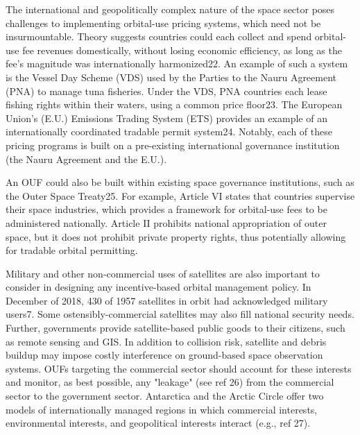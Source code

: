 \documentclass[9pt,twocolumn,twoside,lineno]{pnas-new}
\begin{document}
The international and geopolitically complex nature of the space sector poses challenges to implementing orbital-use pricing systems, which need not be insurmountable. Theory suggests countries could each collect and spend orbital-use fee revenues domestically, without losing economic efficiency, as long as the fee’s magnitude was internationally harmonized22. An example of such a system is the Vessel Day Scheme (VDS) used by the Parties to the Nauru Agreement (PNA) to manage tuna fisheries. Under the VDS, PNA countries each lease fishing rights within their waters, using a common price floor23. The European Union’s (E.U.) Emissions Trading System (ETS) provides an example of an internationally coordinated tradable permit system24. Notably, each of these pricing programs is built on a pre-existing international governance institution (the Nauru Agreement and the E.U.). 

An OUF could also be built within existing space governance institutions, such as the Outer Space Treaty25. For example, Article VI states that countries supervise their space industries, which provides a framework for orbital-use fees to be administered nationally. Article II prohibits national appropriation of outer space, but it does not prohibit private property rights, thus potentially allowing for tradable orbital permitting.

Military and other non-commercial uses of satellites are also important to consider in designing any incentive-based orbital management policy. In December of 2018, 430 of 1957 satellites in orbit had acknowledged military users7. Some ostensibly-commercial satellites may also fill national security needs. Further, governments provide satellite-based public goods to their citizens, such as remote sensing and GIS. In addition to collision risk, satellite and debris buildup may impose costly interference on ground-based space observation systems. OUFs targeting the commercial sector should account for these interests and monitor, as best possible, any "leakage" (see ref 26) from the commercial sector to the government sector. Antarctica and the Arctic Circle offer two models of internationally managed regions in which commercial interests, environmental interests, and geopolitical interests interact (e.g., ref 27).
\end{document}
